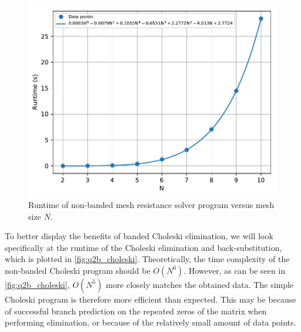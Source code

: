 \documentclass[a4paper,titlepage]{article}
\begin{document}

	\begin{figure}[!htb]
		\centering
		\includegraphics[width=\columnwidth]{plots/q2b.pdf}
		\caption
		{Runtime of non-banded mesh resistance solver program versus mesh size $N$.}
		\label{fig:q2b}
	\end{figure}

	To better display the benefits of banded Choleski elimination, we will look specifically at the runtime of the Choleski elimination and back-substitution, which is plotted in \autoref{fig:q2b_choleski}. Theoretically, the time complexity of the non-banded Choleski program should be $O(N^6)$. However, as can be seen in \autoref{fig:q2b_choleski}, $O(N^5)$ more closely matches the obtained data. The simple Choleski program is therefore more efficient than expected. This may be because of successful branch prediction on the repeated zeros of the matrix when performing elimination, or because of the relatively small amount of data points.
	
\end{document}
